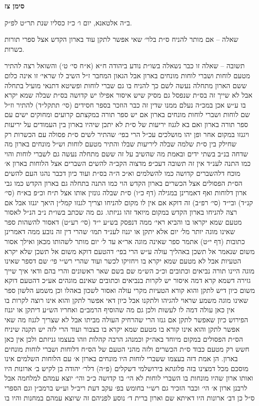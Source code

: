 \documentclass[12pt, openany]{book}
\newcommand{\chapname}{}
\newcommand{\newchap}[1]{
	\addcontentsline{toc}{chapter}{#1}
	\renewcommand{\chapname}{#1}
		\begin{center}
			\textbf{%
\fontsize{16pt}{16pt}\selectfont
				#1}
		\end{center}
}
\begin{document}
\newchap{סימן צז}
\begin{multicols}{2}
ב״ה אלטאנא, יום ו׳ כ״ז כסליו שנת תר״ט לפ״ק.\\\vspace{0pt}

שאלה – אם מותר להניח ס״ת בלוי׳ שאי אפשר לתקן עוד בארון הקדש אצל ספרי תורות כשרות.\\\vspace{0pt}

תשובה – שאלה זו כבר נשאלה בשו״ת נודע ביהודה ח״א (א״ח סי׳ ט׳) והשואל רצה להתיר מטעם לוחות ושברי לוחות מונחים בארון אבל הגאון המחבר ז״ל השיב לו שראי׳ זו אינה כלום ששם הארון מתחלה נעשה לשם כך להניח בו גם שברי לוחות ופשיטא דתנאי מועיל בתחלה אבל לא שייך זה בס״ת שנפסל גם מסיק שיש איסור אפילו יש קדושה בס״ת שבלה שמא יקרא בו ע״ש אכן במכ״ה נעלם ממנו שדין זה כבר הוזכר בספר חסידים (סי׳ תתקל״ד) להתיר וז״ל שם לוחות ושברי לוחות מונחים בארון אם יש ספר תורה במקצתם קרועים ומחוקים ישים עם ספר תורה בארון ואם בא לגנוז יריעות של ס״ת לא יתכן שיהיו בארון בין העמודים על יריעות ויגנזו במקום אחר ופן יהו מושלכים עכ״ל הרי בפי׳ שהתיר לשים ס״ת פסולה עם הכשרות רק שחילק בין ס״ת שלמה שבלה ליריעות שבלו והתיר מטעם לוחות וש״ל מונחים בארון מה שדחה בנ״ב בשתי ידים ובאמת מה שהשיב על זה ששם מתחלה נעשה גם לשברי לוחות והוי כמו התנה לענ״ד אין זה תשובה דעכ״פ מדצוה הקב״ה להשים השברים אצל הלוחות בארון א׳ מוכח דלהשברים קדושה כמו להשלמים וא״כ ה״ה בס״ת ועוד כיון דכבר נהגו העם להשים הס״ת הפסולים אצל הכשרים בארון הקדש הוי כמו התנה בתחלה גם בארון הקדש כמו גבי ארון דלוחות ואף דאמרינן במגילה (דף כ״ו) ס״ת שבלה גונזין אותו אצל ת״ח וכ״פ בא״ח (סי׳ קנ״ד) ובי״ד (סי׳ רפ״ב) זה דוקא אם אין לו מקום להניחו וצריך לגנזו קמל״ן היאך יגנזו אבל אם רצה להניחו בארון הקדש במקום מיואד זהו גניזתו. גם מה שכתב בשו״ת נ״ב הנ״ל לאסור מטעם שמא יקראו בו והביא ראי׳ ממה דנפסק בש״ע י״ד (סי׳ רע״ט) דאסור להשהות ספר שאינו מוגה יותר מל׳ יום אלא יתקן או יגנוז לענ״ד תמו׳ שהרי דין זה נובע ממה דאמרינן כתובות (דף י״ט) אתמר ספר שאינה מוגה אר״א עד ל׳ יום מותר לשהותו מכאן ואילך אסור משום שנאמר אל תשכן באהליך עולה ע״ש הרי בפי׳ דהטעם דוקא משום אל תשכן שלא יקרא הטעיות אבל לא מטעם שמא יקרא בו ויחזיקו לכשר ועוד שהרי רש״י פי׳ שם דספר שאינו מוגה היינו תורה נביאים וכתובים וכ״כ הש״מ שם בשם שאר ראשונים והרי בהם ודאי איך שייך גזירה דשמא קרא דמה איסור יש לקרות בנביאים וכתובים שאינם מוגהים אע״כ דהטעם דוקא משום כיון דיש לתקן והוא קורא הטעיות מקרי עולה ואסור לשכון באהלו וכן משמע הלשון ספר שאינו מוגה משמע שראוי להגיהו ולתקנו אבל כיון דאי אפשר לתקן והוא אינו רוצה לקרות בו אין כאן עולה דמה לו לעשות ולכן גם מה שהוסיף הרמב״ם ואחריו הש״ע דיתקן או יגנוז הפירוש כיון שאפשר לתקן אם גנזו הרי שהרחיק העולה מביתו אבל לא שצריך לגנוז מה שאי אפשר לתקן והוא אינו קורא בו מטעם שמא יקרא בו בצבור ועוד הרי לזה יש תקנה שיניח הס״ת הפסולים במקום מיוחד באה״ק וכמנהג הרבה קהלות וזהו בעצמו גניזתם ולכן אין כאן חשש רק מטעם כבוד ס״ת הכשרים ולזה מהני הטעם של הס״ח דלוחות ושברי לוחות מונחים בארון. הן אמת דזה בעצמו ששברי לוחות היו מונחים בארון א׳ עם הלוחות השלמים אינו מוסכם מכל דמצינו בזה פלוגתא בירושלמי דשקלים (פ״ה) דלר׳ יהודה בן לקיש ב׳ ארונות היו ואותו ארון שהיו מונחות בו השברי לוחות לא הי׳ בו קדושה כ״כ והי׳ יוצא עמהם למלחמה אבל לרבנן ארון א׳ הי׳ וכבר הזכיר גם רש״י בחומש בפ׳ עקב דעת ריב״ל וע״ש ברמב״ן וגם הספרי ס״ל כן דב׳ ארונות היו דאיתא שם וארון ברית ד׳ נוסע לפניהם זה שיוצא עמהם במחנות והיו בו 
\end{multicols}
\end{document}
